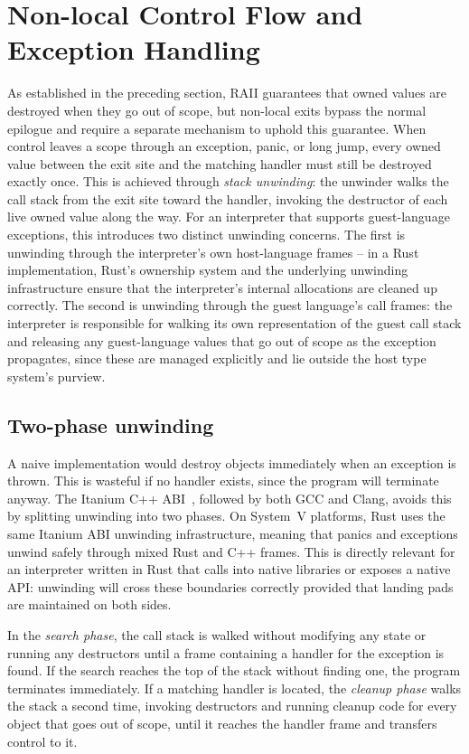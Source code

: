 \section{Non-local Control Flow and Exception Handling}

As established in the preceding section, \ac{RAII} guarantees that owned values are destroyed when they go out of scope, but non-local exits bypass the normal epilogue and require a separate mechanism to uphold this guarantee. When control leaves a scope through an exception, panic, or long jump, every owned value between the exit site and the matching handler must still be destroyed exactly once. This is achieved through \emph{stack unwinding}: the unwinder walks the call stack from the exit site toward the handler, invoking the destructor of each live owned value along the way.
For an interpreter that supports guest-language exceptions, this introduces two distinct unwinding concerns. The first is unwinding through the interpreter's own host-language frames -- in a Rust implementation, Rust's ownership system and the underlying unwinding infrastructure ensure that the interpreter's internal allocations are cleaned up correctly. The second is unwinding through the guest language's call frames: the interpreter is responsible for walking its own representation of the guest call stack and releasing any guest-language values that go out of scope as the exception propagates, since these are managed explicitly and lie outside the host type system's purview.

\subsection{Two-phase unwinding}

A naive implementation would destroy objects immediately when an exception is thrown. This is wasteful if no handler exists, since the program will terminate anyway. The Itanium C++ \ac{ABI}~\cite{itanium-abi-eh}, followed by both GCC and Clang, avoids this by splitting unwinding into two phases. On System~V platforms, Rust uses the same Itanium ABI unwinding infrastructure, meaning that panics and exceptions unwind safely through mixed Rust and C++ frames. This is directly relevant for an interpreter written in Rust that calls into native libraries or exposes a native API: unwinding will cross these boundaries correctly provided that landing pads are maintained on both sides\cite{llvm-eh}.

In the \emph{search phase}, the call stack is walked without modifying any state or running any destructors until a frame containing a handler for the exception is found. If the search reaches the top of the stack without finding one, the program terminates immediately. If a matching handler is located, the \emph{cleanup phase} walks the stack a second time, invoking destructors and running cleanup code for every object that goes out of scope, until it reaches the handler frame and transfers control to it\cite{itanium-abi-eh, llvm-eh}.

